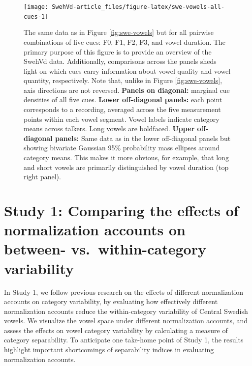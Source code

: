 \documentclass[utf8]{frontiersSCNS}
\begin{document}
\begin{figure}
\texttt{[image: SwehVd-article\_files/figure-latex/swe-vowels-all-cues-1]} \caption{The same data as in Figure \ref{fig:swe-vowels} but for all pairwise combinations of five cues: F0, F1, F2, F3, and vowel duration. The primary purpose of this figure is to provide an overview of the SwehVd data. Additionally, comparisons across the panels sheds light on which cues carry information about vowel quality and vowel quantity, respectively. Note that, unlike in Figure \ref{fig:swe-vowels}, axis directions are not reversed. \textbf{Panels on diagonal:} marginal cue densities of all five cues. \textbf{Lower off-diagonal panels:} each point corresponds to a recording, averaged across the five measurement points within each vowel segment. Vowel labels indicate category means across talkers. Long vowels are boldfaced. \textbf{Upper off-diagonal panels:} Same data as in the lower off-diagonal panels but showing bivariate Gaussian 95\% probability mass ellipses around category means. This makes it more obvious, for example, that long and short vowels are primarily distinguished by vowel duration (top right panel).}\label{fig:swe-vowels-all-cues}
\end{figure}

\hypertarget{sec:studyI}{%
\section*{Study 1: Comparing the effects of normalization accounts on between- vs.~within-category variability}\label{sec:studyI}}

In Study 1, we follow previous research on the effects of different normalization accounts on category variability, by evaluating how effectively different normalization accounts reduce the within-category variability of Central Swedish vowels. We visualize the vowel space under different normalization accounts, and assess the effects on vowel category variability by calculating a measure of category separability. To anticipate one take-home point of Study 1, the results highlight important shortcomings of separability indices in evaluating normalization accounts.
\end{document}
